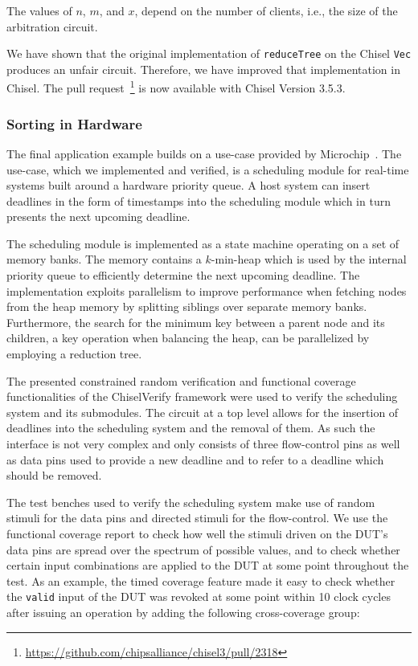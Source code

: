 \documentclass[conference]{IEEEtran}
\newcommand{\code}[1]{{\small{\texttt{#1}}}}
\newcommand{\martin}[1]{{\color{blue} Martin: #1}}
\begin{document}
The values of $n$, $m$, and $x$, depend on the number of clients, i.e., the size of the arbitration
circuit.

We have shown that the original implementation of \code{reduceTree} on the Chisel \code{Vec}
produces an unfair circuit. Therefore, we have improved that implementation in Chisel.
The pull request~\footnote{\url{https://github.com/chipsalliance/chisel3/pull/2318}} is now available
with Chisel Version 3.5.3.

\subsubsection{Sorting in Hardware}


The final application example builds on a use-case provided
by Microchip~\cite{microchip}. The use-case, which we implemented and verified, is a scheduling module for real-time systems built around a hardware priority queue.
A host system can insert deadlines in the form of timestamps into the scheduling module which in turn presents the next upcoming deadline.

The scheduling module is implemented as a state machine 
operating on a set of memory banks. The memory contains a $k$-min-heap which is used by the internal priority queue to efficiently determine the next upcoming deadline. The implementation exploits parallelism to improve performance when fetching nodes from the heap memory by splitting siblings over separate memory banks. Furthermore, the search for the minimum key between a parent node and its children, a key operation when balancing the heap, can be parallelized by employing a reduction tree.

The presented constrained random verification and functional coverage functionalities of the ChiselVerify framework were used to verify the scheduling system and its submodules. 
The circuit at a top level allows for the insertion of deadlines into the scheduling system and the removal of them. As such the interface is not very complex and only consists of three flow-control pins as well as data pins used to provide a new deadline and to refer to a deadline which should be removed. 


The test benches used to verify the scheduling system make use of random stimuli for the data pins and directed stimuli for the flow-control.
We use the functional coverage report to check how well the stimuli driven on the DUT's data pins are spread over the spectrum of possible values, and to check whether certain input combinations are applied to the DUT at some point throughout the test. 
As an example, the timed coverage feature made it easy to check whether the \texttt{valid} input of the DUT was revoked at some point within 10 clock cycles after issuing an operation by adding the following cross-coverage group:
\end{document}
